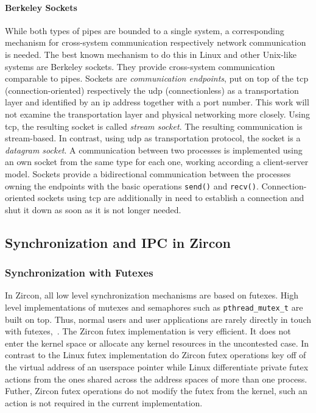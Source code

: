 \paragraph{Berkeley Sockets}
While both types of pipes are bounded to a single system, a corresponding mechanism for cross-system communication respectively network communication is needed.
The best known mechanism to do this in Linux and other Unix-like systems are Berkeley sockets.
They provide cross-system communication comparable to pipes\cite{glatz2015betriebssysteme}.
Sockets are \textit{communication endpoints}, put on top of the \ac{tcp} (connection-oriented) respectively the \ac{udp} (connectionless) as a transportation layer and identified by an \ac{ip} address together with a port number\cite{silberschatz2009operating}.
This work will not examine the transportation layer and physical networking more closely.
Using \ac{tcp}, the resulting socket is called \textit{stream socket}.
The resulting communication is stream-based.
In contrast, using \ac{udp} as transportation protocol, the socket is a \textit{datagram socket}\cite{silberschatz2009operating}.
A communication between two processes is implemented using an own socket from the same type for each one, working according a client-server model.
Sockets provide a bidirectional communication between the processes owning the endpoints with the basic operations \texttt{send()} and \texttt{recv()}.
Connection-oriented sockets using \ac{tcp} are additionally in need to establish a connection and shut it down as soon as it is not longer needed\cite{glatz2015betriebssysteme}.


\subsection{Synchronization and IPC in Zircon}

\subsubsection*{Synchronization with Futexes}
In Zircon, all low level synchronization mechanisms are based on futexes.
High level implementations of mutexes and semaphores such as \texttt{pthread\_mutex\_t} are built on top.
Thus, normal users and user applications are rarely directly in touch with futexes\cite{zircon-concepts},~\cite{zircon-futex}.
The Zircon futex implementation is very efficient.
It does not enter the kernel space or allocate any kernel resources in the uncontested case.
In contrast to the Linux futex implementation do Zircon futex operations key off of the virtual address of an userspace pointer while Linux differentiate private futex actions from the ones shared across the address spaces of more than one process.
Futher, Zircon futex operations do not modify the futex from the kernel, such an action is not required in the current implementation\cite{zircon-futex}.

